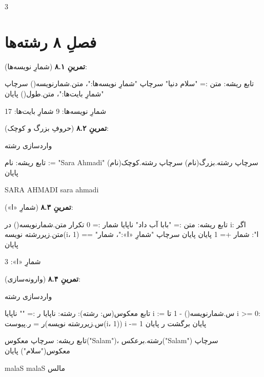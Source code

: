 \begin{progoutfa}
3
\end{progoutfa}

\section*{فصلِ ۸ رشته‌ها}
{}

\textbf{تمرینِ ۸.۱} (شمارِ نویسه‌ها):
\begin{salamfa}
تابع ریشه:
    متن := "سلام دنیا"
    سرچاپ "شمارِ نویسه‌ها:"، متن.شمارنویسه()
    سرچاپ "شمارِ بایت‌ها:"، متن.طول()
پایان
\end{salamfa}

\begin{progoutfa}
شمارِ نویسه‌ها: 9
شمارِ بایت‌ها: 17
\end{progoutfa}

\textbf{تمرینِ ۸.۲} (حروفِ بزرگ و کوچک):
\begin{salamfa}
واردسازی رشته

تابع ریشه:
    نام := "Sara Ahmadi"
    سرچاپ رشته.بزرگ(نام)
    سرچاپ رشته.کوچک(نام)
پایان
\end{salamfa}

\begin{progoutfa}
SARA AHMADI
sara ahmadi
\end{progoutfa}

\textbf{تمرینِ ۸.۳} (شمارِ «ا»):
\begin{salamfa}
تابع ریشه:
    متن := "بابا آب داد"
    ناپایا شمار := 0
    تکرار متن.شمارنویسه() در i:
        اگر متن.زیررشته نویسه(i، 1) == "ا":
            شمار += 1
        پایان
    پایان
    سرچاپ "شمارِ «ا»:"، شمار
پایان
\end{salamfa}

\begin{progoutfa}
شمارِ «ا»: 3
\end{progoutfa}

\textbf{تمرینِ ۸.۴} (وارونه‌سازی):
\begin{salamfa}
واردسازی رشته

تابع معکوس(س: رشته): رشته:
    ناپایا ر := ""
    ناپایا i := س.شمارنویسه() - 1
    تا i >= 0:
        ر = ر.پیوست(س.زیررشته نویسه(i، 1))
        i -= 1
    پایان
    برگشت ر
پایان

تابع ریشه:
    سرچاپ معکوس("Salam")، رشته.برعکس("Salam")
    سرچاپ معکوس("سلام")
پایان
\end{salamfa}

\begin{progoutfa}
malaS malaS
مالس
\end{progoutfa}

